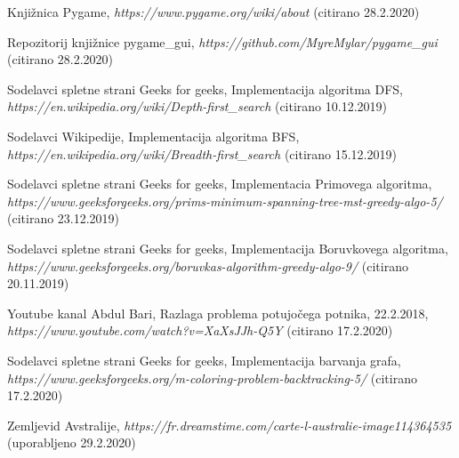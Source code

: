 \documentclass[11pt]{article}
\begin{document}
\begin{thebibliography}{9}
	\begin{flushleft}
	Knjižnica Pygame, 
	\textit{https://www.pygame.org/wiki/about} (citirano 28.2.2020)
	\end{flushleft}
	
	\begin{flushleft}	
	Repozitorij knjižnice pygame\_gui, 
	\textit{https://github.com/MyreMylar/pygame\_gui} (citirano 28.2.2020)
	\end{flushleft}
	
	\begin{flushleft}	
	Sodelavci spletne strani Geeks for geeks, Implementacija algoritma DFS, 
	\textit{https://en.wikipedia.org/wiki/Depth-first\_search} (citirano 10.12.2019)
	\end{flushleft}
	
	\begin{flushleft}	
	Sodelavci Wikipedije, Implementacija algoritma BFS, 
	\textit{https://en.wikipedia.org/wiki/Breadth-first\_search} (citirano 15.12.2019)
	\end{flushleft}
	
	\begin{flushleft}	
	Sodelavci spletne strani Geeks for geeks, Implementacia Primovega algoritma, 
	\textit{https://www.geeksforgeeks.org/prims-minimum-spanning-tree-mst-greedy-algo-5/} (citirano 23.12.2019)
	\end{flushleft}	
	
	\begin{flushleft}	
	Sodelavci spletne strani Geeks for geeks, Implementacija Boruvkovega algoritma, \textit{https://www.geeksforgeeks.org/boruvkas-algorithm-greedy-algo-9/} (citirano 20.11.2019)
	\end{flushleft}	
	
	\begin{flushleft}	
	Youtube kanal Abdul Bari, Razlaga problema potujočega potnika, 22.2.2018, \textit{https://www.youtube.com/watch?v=XaXsJJh-Q5Y} (citirano 17.2.2020)
	\end{flushleft}	
	
	\begin{flushleft}	
	Sodelavci spletne strani Geeks for geeks, Implementacija barvanja grafa, \textit{https://www.geeksforgeeks.org/m-coloring-problem-backtracking-5/} (citirano 17.2.2020)
	\end{flushleft}	
	
	\begin{flushleft}
	Zemljevid Avstralije, \textit{https://fr.dreamstime.com/carte-l-australie-image114364535} (uporabljeno 29.2.2020)
	\end{flushleft}

\end{thebibliography}
\end{document}
